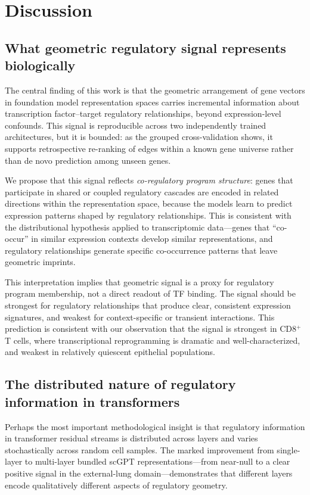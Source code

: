 \documentclass[11pt]{article}
\begin{document}
\section*{Discussion}

\subsection*{What geometric regulatory signal represents biologically}

The central finding of this work is that the geometric arrangement of gene vectors in foundation model representation spaces carries incremental information about transcription factor--target regulatory relationships, beyond expression-level confounds.
This signal is reproducible across two independently trained architectures, but it is bounded: as the grouped cross-validation shows, it supports retrospective re-ranking of edges within a known gene universe rather than de novo prediction among unseen genes.

We propose that this signal reflects \emph{co-regulatory program structure}: genes that participate in shared or coupled regulatory cascades are encoded in related directions within the representation space, because the models learn to predict expression patterns shaped by regulatory relationships.
This is consistent with the distributional hypothesis applied to transcriptomic data---genes that ``co-occur'' in similar expression contexts develop similar representations, and regulatory relationships generate specific co-occurrence patterns that leave geometric imprints.

This interpretation implies that geometric signal is a proxy for regulatory program membership, not a direct readout of TF binding.
The signal should be strongest for regulatory relationships that produce clear, consistent expression signatures, and weakest for context-specific or transient interactions.
This prediction is consistent with our observation that the signal is strongest in CD8$^+$ T cells, where transcriptional reprogramming is dramatic and well-characterized, and weakest in relatively quiescent epithelial populations.

\subsection*{The distributed nature of regulatory information in transformers}

Perhaps the most important methodological insight is that regulatory information in transformer residual streams is distributed across layers and varies stochastically across random cell samples.
The marked improvement from single-layer to multi-layer bundled scGPT representations---from near-null to a clear positive signal in the external-lung domain---demonstrates that different layers encode qualitatively different aspects of regulatory geometry.
\end{document}
